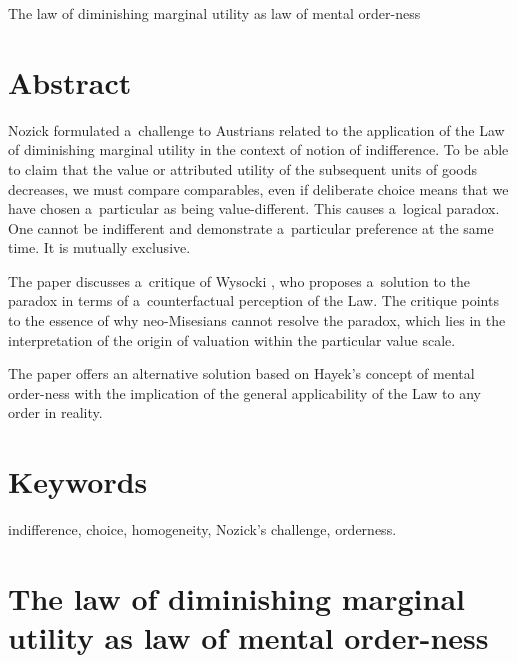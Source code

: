\setcounter{secnumdepth}{0}







The law of diminishing marginal utility as law of mental order-ness





\section{Abstract}

Nozick 
\parencite*[][]{} %
 formulated a~challenge to Austrians related to the application of the Law of diminishing marginal utility in the context of notion of indifference. To be able to claim that the value or attributed utility of the subsequent units of goods decreases, we must compare comparables, even if deliberate choice means that we have chosen a~particular as being value-different. This causes a~logical paradox. One cannot be indifferent and demonstrate a~particular preference at the same time. It is mutually exclusive.



The paper discusses a~critique of Wysocki 
\parencite*[][]{}, %
 who proposes a~solution to the paradox in terms of a~counterfactual perception of the Law. The critique points to the essence of why neo-Misesians cannot resolve the paradox, which lies in the interpretation of the origin of valuation within the particular value scale.



The paper offers an alternative solution based on Hayek's concept of mental order-ness with the implication of the general applicability of the Law to any order in reality.



\section{Keywords}

indifference, choice, homogeneity, Nozick's challenge, orderness.



\section*{The law of diminishing marginal utility as law of mental order-ness}

